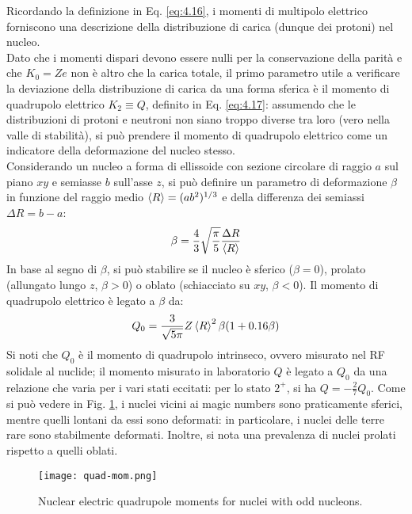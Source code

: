 Ricordando la definizione in Eq. \ref{eq:4.16}, i momenti di multipolo elettrico forniscono una descrizione della distribuzione di carica (dunque dei protoni) nel nucleo.\\
Dato che i momenti dispari devono essere nulli per la conservazione della parità e che $ K_0 = Ze $ non è altro che la carica totale, il primo parametro utile a verificare la deviazione della distribuzione di carica da una forma sferica è il momento di quadrupolo elettrico $ K_2 \equiv Q $, definito in Eq. \ref{eq:4.17}: assumendo che le distribuzioni di protoni e neutroni non siano troppo diverse tra loro (vero nella valle di stabilità), si può prendere il momento di quadrupolo elettrico come un indicatore della deformazione del nucleo stesso.\\
Considerando un nucleo a forma di ellissoide con sezione circolare di raggio $ a $ sul piano $ xy $ e semiasse $ b $ sull'asse $ z $, si può definire un parametro di deformazione $ \beta $ in funzione del raggio medio $ \braket{R} = (ab^2)^{1/3} $ e della differenza dei semiassi $ \Delta R = b - a $:
\begin{equation}
	\beta = \frac{4}{3} \sqrt{\frac{\pi}{5}} \frac{\Delta R}{\braket{R}}
	\label{eq:5.9}
\end{equation}
In base al segno di $ \beta $, si può stabilire se il nucleo è sferico ($ \beta = 0 $), prolato (allungato lungo $ z $, $ \beta > 0 $) o oblato (schiacciato su $ xy $, $ \beta < 0 $). Il momento di quadrupolo elettrico è legato a $ \beta $ da:
\begin{equation}
	Q_0 = \frac{3}{\sqrt{5\pi}} Z \braket{R}^2 \beta (1 + 0.16 \beta)
	\label{eq:5.10}
\end{equation}
Si noti che $ Q_0 $ è il momento di quadrupolo intrinseco, ovvero misurato nel RF solidale al nuclide; il momento misurato in laboratorio $ Q $ è legato a $ Q_0 $ da una relazione che varia per i vari stati eccitati: per lo stato $ 2^+ $, si ha $ Q = - \frac{2}{7} Q_0 $.
Come si può vedere in Fig. \ref{quad-mom}, i nuclei vicini ai magic numbers sono praticamente sferici, mentre quelli lontani da essi sono deformati: in particolare, i nuclei delle terre rare sono stabilmente deformati. Inoltre, si nota una prevalenza di nuclei prolati rispetto a quelli oblati.

\begin{figure}[!t]
	\centering
	\texttt{[image: quad-mom.png]}
	\caption{Nuclear electric quadrupole moments for nuclei with odd nucleons.}
	\label{quad-mom}
\end{figure}

